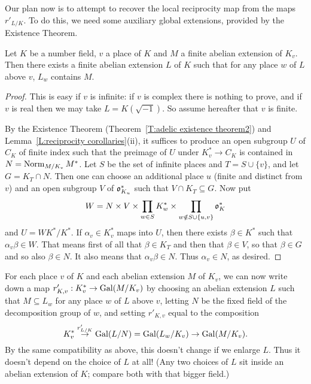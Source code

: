 Our plan now is to attempt to recover the local reciprocity map
from the maps $r'_{L/K}$. To do this, we need some auxiliary global extensions,
provided by the Existence Theorem.
\begin{lemma}
Let $K$ be a number field, $v$ a place of $K$ and $M$ a finite
abelian extension
of $K_v$. Then there exists a finite abelian extension $L$ of $K$ such that
for any place $w$ of $L$ above $v$, $L_w$ contains $M$.
\end{lemma}
\begin{proof}
This is easy if $v$ is infinite: if $v$ is complex there is nothing to
prove, and if $v$ is real then we may take $L = K(\sqrt{-1})$. So
assume hereafter that $v$ is finite.

By the Existence Theorem (Theorem~\ref{T:adelic existence theorem2}) and Lemma~\ref{L:reciprocity corollaries}(ii),
it suffices to produce an open subgroup $U$ of $C_K$ of finite index
such that the preimage of $U$ under $K_v^* \to C_K$ is contained in
$N = \operatorname{Norm}_{M/K_v} M^*$. Let $S$ be the set of infinite places
and $T = S \cup \{v\}$,
and let $G = K_T \cap N$. Then one can choose an additional place
$u$ (finite and distinct from $v$) and an open subgroup $V$ of $\mathfrak{o}_{K_u}^*$
such that $V \cap K_T \subseteq G$. Now put
\[
W = N \times V \times \prod_{w \in S} K_w^* \times \prod_{w \notin S \cup \{u,v\}} \mathfrak{o}_K^*
\]
and $U = W K^*/K^*$. If $\alpha_v \in K_v^*$ maps into $U$, then there
exists $\beta \in K^*$ such that $\alpha_v \beta \in W$. That means
first of all that $\beta \in K_T$ and then that $\beta \in V$, so that
$\beta \in G$ and so also $\beta \in N$. It also means that $\alpha_v \beta
\in N$. Thus $\alpha_v \in N$, as desired.
\end{proof}

For each place $v$ of $K$ and each abelian extension
$M$ of $K_v$, we can now write down
a map $r'_{K,v}: K_v^* \to \operatorname{Gal}(M/K_v)$ 
by choosing an abelian extension $L$ such that $M \subseteq L_w$ for
any place $w$ of $L$ above $v$, letting $N$ be the fixed field of the
decomposition group of $w$,
and setting $r'_{K,v}$ equal to the composition
\[
K_v^* \stackrel{r'_{L/K}}{\to} \operatorname{Gal}(L/N) = \operatorname{Gal}(L_w/K_v) \to \operatorname{Gal}(M/K_v).
\]
By the same compatibility as above, this doesn't change if we enlarge $L$.
Thus it doesn't depend on the choice of $L$ at all! (Any two choices of $L$
sit inside an abelian extension of $K$; compare both with that bigger field.)

